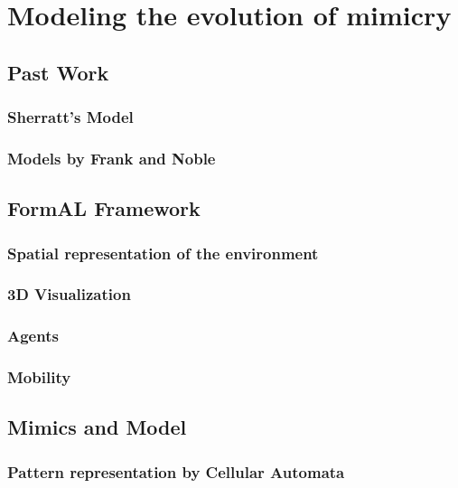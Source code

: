 \chapter{Modeling the evolution of mimicry}

\section{Past Work}

\subsection{Sherratt's Model}

\subsection{Models by Frank and Noble}

\section{FormAL Framework}

\subsection{Spatial representation of the environment}

\subsection{3D Visualization}

\subsection{Agents}

\subsection{Mobility}

\section{Mimics and Model}

\subsection{Pattern representation by Cellular Automata}

